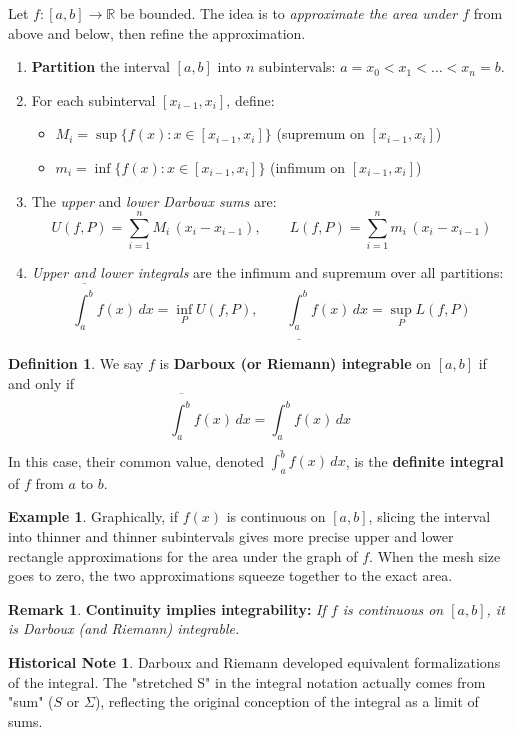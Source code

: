\documentclass[11pt]{article}
\theoremstyle{definition}
\newtheorem{definition}{Definition}[section]
\newtheorem{examplex}{Example}[section]
\newtheorem*{remark}{Remark}
\newtheorem*{historicalnote}{Historical Note}
\theoremstyle{plain}
\begin{document}
Let $f: [a,b] \to \mathbb{R}$ be bounded. The idea is to \emph{approximate the area under $f$} from above and below, then refine the approximation.

\begin{enumerate}
\item \textbf{Partition} the interval $[a,b]$ into $n$ subintervals: $a = x_0 < x_1 < \dots < x_n = b$.
\item For each subinterval $[x_{i-1}, x_i]$, define:
    \begin{itemize}
        \item $M_i = \sup\{ f(x) : x \in [x_{i-1}, x_i] \}$ (supremum on $[x_{i-1},x_i]$)
        \item $m_i = \inf\{ f(x) : x \in [x_{i-1}, x_i] \}$ (infimum on $[x_{i-1},x_i]$)
    \end{itemize}
\item The \emph{upper} and \emph{lower Darboux sums} are:
    \[
    U(f,P) = \sum_{i=1}^n M_i\, (x_i - x_{i-1}),\qquad
    L(f,P) = \sum_{i=1}^n m_i\, (x_i - x_{i-1})
    \]
\item \emph{Upper and lower integrals} are the infimum and supremum over all partitions:
    \[
    \overline{\int_a^b} f(x)\,dx = \inf_P U(f,P), \qquad
    \underline{\int_a^b} f(x)\,dx = \sup_P L(f,P)
    \]
\end{enumerate}

\begin{definition}
We say $f$ is \textbf{Darboux (or Riemann) integrable} on $[a,b]$ if and only if
\[
\overline{\int_a^b} f(x)\,dx = \underline{\int_a^b} f(x)\,dx
\]
In this case, their common value, denoted $\int_a^b f(x)\,dx$, is the \textbf{definite integral} of $f$ from $a$ to $b$.
\end{definition}

\begin{examplex}
Graphically, if $f(x)$ is continuous on $[a, b]$, slicing the interval into thinner and thinner subintervals gives more precise upper and lower rectangle approximations for the area under the graph of $f$. When the mesh size goes to zero, the two approximations squeeze together to the exact area.
\end{examplex}

\begin{remark}
\textbf{Continuity implies integrability:} \emph{If $f$ is continuous on $[a, b]$, it is Darboux (and Riemann) integrable.}
\end{remark}

\begin{historicalnote}
Darboux and Riemann developed equivalent formalizations of the integral. The "stretched S" in the integral notation actually comes from "sum" ($S$ or $\Sigma$), reflecting the original conception of the integral as a limit of sums.
\end{historicalnote}
\end{document}
